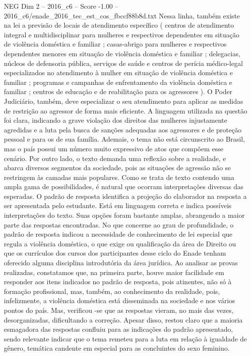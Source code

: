 \begin{textsample}{NEG Dim 2 – 2016\_c6 – Score -1.00 – 2016\_c6/enade\_2016\_tec\_est\_cos\_fbccf88b8d.txt}
Nessa linha, também existe na lei a previsão de locais de atendimento específico ( centros de atendimento integral e multidisciplinar para mulheres e respectivos dependentes em situação de violência doméstica e familiar ; casas-abrigo para mulheres e respectivos dependentes menores em situação de violência doméstica e familiar ; delegacias, núcleos de defensoria pública, serviços de saúde e centros de perícia médico-legal especializados no atendimento à mulher em situação de violência doméstica e familiar ; programas e campanhas de enfrentamento da violência doméstica e familiar ; centros de educação e de reabilitação para os agressores ).
O Poder Judiciário, também, deve especializar o seu atendimento para aplicar as medidas de restrição ao agressor de forma mais eficiente.
A linguagem utilizada na questão foi clara, indicando a grave violação dos direitos das mulheres injustamente agredidas e a luta pela busca de sanções adequadas aos agressores e de proteção pessoal e para os de sua família.
Ademais, o tema não está circunscrito ao Brasil, mas o país possui um número muito expressivo de atos que compõem esse cenário.
Por outro lado, o texto demanda uma reflexão sobre a realidade, e abarca diversos segmentos da sociedade, pois as situações de agressão não se restringem às camadas mais populares.
Como se trata de texto contendo uma ampla gama de possibilidades, é natural que ocorram interpretações diversas das esperadas.
O padrão de resposta identifica a projeção do elaborador na resposta a ser apresentada pelo estudante.
Está em linguagem correta e indica possíveis interpretações do texto.
Suas opções foram bastante amplas, abrangendo a maior parte das respostas encontradas.
No que concerne ao grau de profundidade, o padrão de resposta indicou a necessidade de conhecimento de lei especial que regula a violência doméstica, o que exige ou qualificação da área de Direito ou que os currículos dos cursos dos participantes desse ciclo do Enade tenham oferecido alguma disciplina introdutória da área jurídica.
Ao analisar as provas realizadas, constatamos que, na primeira parte, houve maior facilidade em responder aos itens indicados no padrão de resposta, pois atinentes, não só à formação profissional, mas, também, ao conhecimento da realidade, pois, infelizmente, a violência doméstica está disseminada na sociedade e nos vários pontos do país.
Mas, verificou -se que as respostas vieram, no mais das vezes, desorganizadas, dificultando a correção.
Apesar disso, restou claro que a maioria esmagadora das respostas confluiu para as indicações do padrão apresentado, sendo relevante indicar que o tema remeteu para a luta em relação à igualdade de gênero, temática candente em especial para as concluintes do sexo feminino.

\end{textsample}
